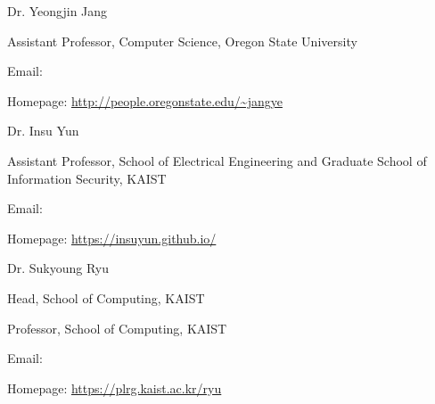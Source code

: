 \begin{timeitemize}{Dr. Yeongjin Jang}{}
    \item Assistant Professor, Computer Science, Oregon State University
    \item Email: 
    \item Homepage: \url{http://people.oregonstate.edu/~jangye}
\end{timeitemize}

\begin{timeitemize}{Dr. Insu Yun}{}
    \item Assistant Professor, School of Electrical Engineering and Graduate School of Information Security, KAIST
    \item Email: 
    \item Homepage: \url{https://insuyun.github.io/}
\end{timeitemize}

\begin{timeitemize}{Dr. Sukyoung Ryu}{}
    \item Head, School of Computing, KAIST
    \item Professor, School of Computing, KAIST
    \item Email: 
    \item Homepage: \url{https://plrg.kaist.ac.kr/ryu}
\end{timeitemize}
